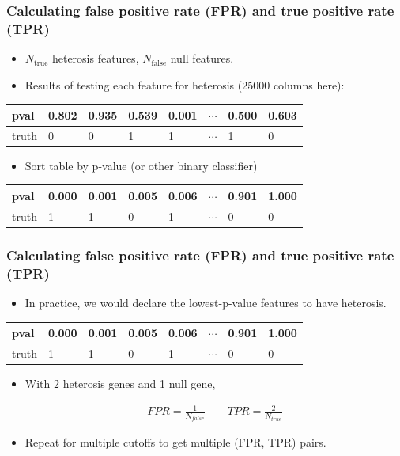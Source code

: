 \documentclass[handout]{beamer}
\numberwithin{equation}{section}
\begin{document}
\begin{frame}
\frametitle{Calculating false positive rate (FPR) and true positive rate (TPR)}

\begin{itemize}
\item $N_{\text{true}}$ heterosis features, $N_{\text{false}}$ null features.
\pause \item Results of testing each feature for heterosis (25000 columns here):
\end{itemize}

\begin{tabular}{l|l|l|l|l|l|l|l}
pval & 0.802 & 0.935 & 0.539 & 0.001 & $\cdots$ & 0.500 &  0.603  \\ \hline
truth &  0 & 0 & 1 & 1 & $\cdots$ & 1 & 0 
\end{tabular}

\begin{itemize}

\pause \item Sort table by p-value (or other binary classifier)
\end{itemize}

\begin{tabular}{l|l|l|l|l|l|l|l}
pval & 0.000 & 0.001 & 0.005 & 0.006 & $\cdots$ & 0.901 & 1.000  \\ \hline
truth &  1 & 1 & 0 & 1 & $\cdots$ & 0 & 0
\end{tabular}
\end{frame}

\begin{frame}
\frametitle{Calculating false positive rate (FPR) and true positive rate (TPR)}

\begin{itemize}
\pause \item In practice, we would declare the lowest-p-value features to have heterosis.
\end{itemize}

\pause \begin{tabular}{l|l|l|l|l|l|l|l}
pval & {\color{blue} 0.000} & {\color{blue}0.001} & {\color{blue}0.005} & 0.006 & $\cdots$ & 0.901 & 1.000  \\ \hline
truth & {\color{blue}1} & {\color{blue}1} & {\color{blue}0} & 1 & $\cdots$ & 0 & 0
\end{tabular}

\begin{itemize}
\pause \item With 2 heterosis genes and 1 null gene,

\begin{align*}
FPR = \frac{1}{N_{false}} \qquad TPR = \frac{2}{N_{true}}
\end{align*}

\pause \item Repeat for multiple cutoffs to get multiple (FPR, TPR) pairs.
\end{itemize}
\end{frame}
\end{document}
